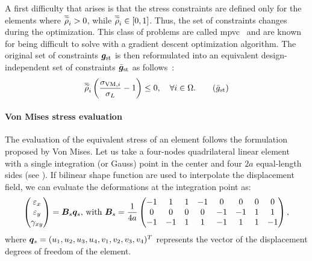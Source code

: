 A first difficulty that arises is that the stress constraints are defined only for the elements where $\overline{\widetilde{\rho}}_i > 0$, while $\overline{\widetilde{\rho}}_i\in[0,1]$. Thus, the set of constraints changes during the optimization. This class of problems are called \acrfull{mpvc}~ and are known for being difficult to solve with a gradient descent optimization algorithm. The original set of constraints $\bm{g}_{\text{st}}$ is then reformulated into an equivalent design-independent set of constraints $\bar{\bm{g}}_{\text{st}}$ as follows~:
\begin{equation}
    \rhophys_i\left(\frac{ \sigma_{\text{VM},i}}{\sigma_L}-1 \right) \leq 0, \quad \forall i \in \Omega.
    \tag{$\bar{g}_{\text{st}}$}
\end{equation}

\paragraph{Von Mises stress evaluation}
The evaluation of the equivalent stress of an element follows the formulation proposed by Von Mises. Let us take a four-nodes quadrilateral linear element with a single integration (or Gauss) point in the center and four $2a$ equal-length sides (see ). If bilinear shape function are used to interpolate the displacement field, we can evaluate the deformations at the integration point as:
\begin{equation}
    \begin{pmatrix}
    \varepsilon_x \\
    \varepsilon_y \\
    \gamma_{xy}
    \end{pmatrix} = \bm{B}_s\bm{q}_s
    \textrm{,  with }
    \bm{B}_s =
    \frac{1}{4a}
    \begin{pmatrix}
    -1  &   1   &   1   &   -1  &   0   &   0   &   0   &   0   \\
    0   &   0   &   0   &   0   &   -1  &   -1  &   1   &   1   \\
    -1  &   -1  &   1   &   1   &   -1  &   1   &   1   &   -1
    \end{pmatrix},
\end{equation}
where $\bm{q}_s = (u_1, u_2, u_3, u_4, v_1, v_2, v_3, v_4)^T$ represents the vector of the displacement degrees of freedom of the element. 

